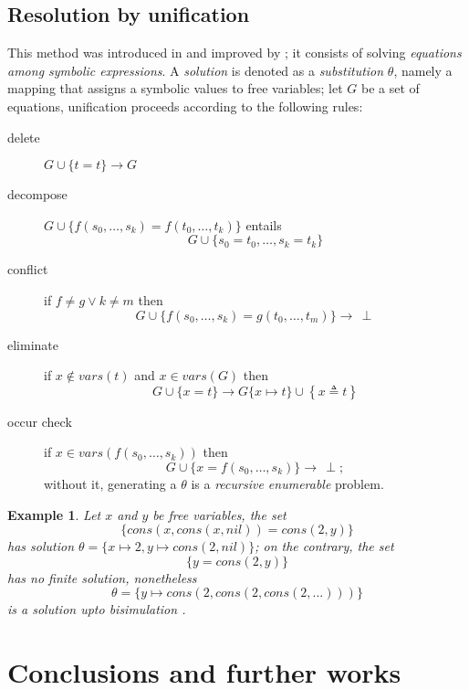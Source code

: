 \documentclass[a4paper,12pt]{article}
\newtheorem{example}[theorem]{Example}
\begin{document}
\subsection{Resolution by unification}

This method was introduced in \citep{robinson_unif} and
improved by \citep{Martelli:1982:EUA:357162.357169}; it consists of solving
\textit{equations among symbolic expressions}. A \textit{solution} is denoted
as a \textit{substitution} $\theta$, namely a mapping that assigns a symbolic
values to free variables; let $G$ be a set of equations, unification proceeds
according to the following rules:
\begin{description}
\item[delete] $G \cup \lbrace t = t \rbrace \rightarrow G$
\item[decompose] $G \cup \lbrace f(s_{0}, \ldots, s_{k}) = f(t_{0}, \ldots, t_{k})\rbrace$ entails
$$G \cup \lbrace s_{0}=t_{0},\ldots, s_{k}=t_{k} \rbrace$$
\item[conflict] if $f\neq g \vee k\neq m$ then $$G \cup \lbrace f(s_{0}, \ldots, s_{k}) = g(t_{0}, \ldots, t_{m})\rbrace \rightarrow \,\perp$$
\item[eliminate] if $x \not\in vars(t)$ and $x \in vars(G)$ then $$G \cup \lbrace x = t\rbrace \rightarrow G\lbrace x \mapsto t\rbrace \cup \left\lbrace x \triangleq t\right\rbrace $$
\item[occur check] if $x \in vars(f(s_{0},\ldots,s_{k}))$ then $$G \cup \lbrace x = f(s_{0}, \ldots, s_{k})\rbrace \rightarrow \,\perp;$$
without it, generating a $\theta$ is a
\emph{recursive enumerable} problem.
\end{description}

\begin{example}
Let $x$ and $y$ be free variables, the set
$$\lbrace cons(x,cons(x,nil)) = cons(2,y)\rbrace$$
has solution $\theta = \lbrace x \mapsto 2, y \mapsto cons(2,nil) \rbrace$;
on the contrary, the set
$$ \lbrace y = cons(2,y) \rbrace $$
has no \textit{finite} solution, nonetheless
$$\theta = \lbrace y \mapsto cons(2,cons(2,cons(2,...))) \rbrace$$
is a solution upto \textit{bisimulation}
\citep{10.1007/BFb0017309, DBLP:books/daglib/0067019}.
\end{example}
\section{Conclusions and further works}
\end{document}
